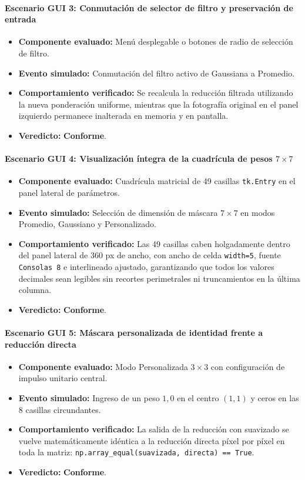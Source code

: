 \documentclass[11pt]{article}
\newcommand{\pruebaok}{\textcolor{verdeExito}{\textbf{Conforme}}}
\begin{document}
\paragraph{Escenario GUI 3: Conmutación de selector de filtro y preservación de entrada}
\begin{itemize}[itemsep=0.15em]
\item \textbf{Componente evaluado:} Menú desplegable o botones de radio de selección de filtro.
\item \textbf{Evento simulado:} Conmutación del filtro activo de Gaussiana a Promedio.
\item \textbf{Comportamiento verificado:} Se recalcula la reducción filtrada utilizando la nueva ponderación uniforme, mientras que la fotografía original en el panel izquierdo permanece inalterada en memoria y en pantalla.
\item \textbf{Veredicto:} \pruebaok.
\end{itemize}

\paragraph{Escenario GUI 4: Visualización íntegra de la cuadrícula de pesos $7\times7$}
\begin{itemize}[itemsep=0.15em]
\item \textbf{Componente evaluado:} Cuadrícula matricial de 49 casillas \texttt{tk.Entry} en el panel lateral de parámetros.
\item \textbf{Evento simulado:} Selección de dimensión de máscara $7\times7$ en modos Promedio, Gaussiano y Personalizado.
\item \textbf{Comportamiento verificado:} Las 49 casillas caben holgadamente dentro del panel lateral de 360 px de ancho, con ancho de celda \texttt{width=5}, fuente \texttt{Consolas 8} e interlineado ajustado, garantizando que todos los valores decimales sean legibles sin recortes perimetrales ni truncamientos en la última columna.
\item \textbf{Veredicto:} \pruebaok.
\end{itemize}

\paragraph{Escenario GUI 5: Máscara personalizada de identidad frente a reducción directa}
\begin{itemize}[itemsep=0.15em]
\item \textbf{Componente evaluado:} Modo Personalizada $3\times3$ con configuración de impulso unitario central.
\item \textbf{Evento simulado:} Ingreso de un peso $1,0$ en el centro $(1, 1)$ y ceros en las 8 casillas circundantes.
\item \textbf{Comportamiento verificado:} La salida de la reducción con suavizado se vuelve matemáticamente idéntica a la reducción directa píxel por píxel en toda la matriz: \texttt{np.array\_equal(suavizada, directa) == True}.
\item \textbf{Veredicto:} \pruebaok.
\end{itemize}
\end{document}
